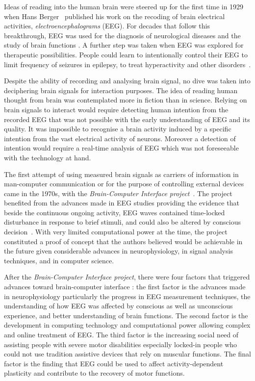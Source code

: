 Ideas of reading into the human brain were steered up for the first time in 1929 when Hans Berger~\citep{berger_uber_1929} published his work on the recoding of brain electrical activities, \emph{electroencephalograms} (EEG). 
For decades that follow this breakthrough, EEG was used for the diagnosis of neurological diseases and the study of brain functions \citep{wolpaw_brain-computer_2002,daly_brain-computer_2008}. 
A further step was taken when EEG was explored for therapeutic possibilities. People could learn to intentionally control their EEG to limit frequency of seizures in epilepsy, to treat hyperactivity and other disorders~\citep{daly_brain-computer_2008}.

Despite the ability of recording and analysing brain signal, no dive was taken into deciphering brain signals for interaction purposes. 
The idea of reading human thought from brain was contemplated more in fiction than in science.
Relying on brain signals to interact would require detecting human intention from the recorded EEG that was not possible with the early understanding of EEG and its quality. It was impossible to recognise a brain activity induced by a specific intention from the vast electrical activity of neurons. Moreover a detection of intention would require a real-time analysis of EEG which was not foreseeable with the technology at hand. 

The first attempt of using measured brain signals as carriers of information in man-computer communication or for the purpose of controlling external devices came in the 1970s, with the \emph{Brain-Computer Interface project}~\citep{vidal_toward_1973}. 
The project benefited from the advances made in EEG studies providing the evidence that beside the continuous ongoing activity, EEG waves contained time-locked disturbance in response to brief stimuli, and could also be altered by conscious decision~\citep{donchin_discriminant_1969, vidal_toward_1973}.
With very limited computational power at the time, the project constituted a proof of concept that the authors believed would be achievable in the future given considerable advances in neurophysiology, in signal analysis techniques, and in computer science.   

After the \emph{Brain-Computer Interface project}, there were four factors that triggered advances toward brain-computer interface \citep{wolpaw_brain-computer_2002}: the first factor is the advances made in neurophysiology particularly the progress in EEG measurement techniques, the understanding of how EEG was affected by conscious as well as unconscious experience, and better understanding of brain functions. 
The second factor is the development in computing technology and computational power allowing complex and online treatment of EEG.
The third factor is the increasing social need of assisting people with severe motor disabilities especially locked-in people who could not use tradition assistive devices that rely on muscular functions. 
The final factor is the finding that EEG could be used to affect activity-dependent plasticity and contribute to the recovery of motor functions.

